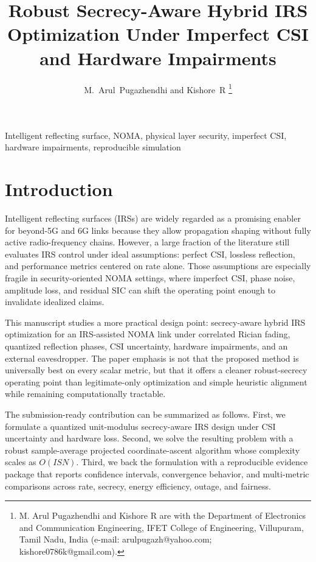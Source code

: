 \documentclass[journal]{IEEEtran}
\title{Robust Secrecy-Aware Hybrid IRS Optimization Under Imperfect CSI and Hardware Impairments}
\author{M.~Arul~Pugazhendhi and Kishore~R%
\thanks{M. Arul Pugazhendhi and Kishore R are with the Department of Electronics and Communication Engineering, IFET College of Engineering, Villupuram, Tamil Nadu, India (e-mail: arulpugazh@yahoo.com; kishore0786k@gmail.com).}}
\begin{document}
\maketitle

\begin{abstract}

\end{abstract}

\begin{IEEEkeywords}
Intelligent reflecting surface, NOMA, physical layer security, imperfect CSI, hardware impairments, reproducible simulation
\end{IEEEkeywords}

\section{Introduction}
Intelligent reflecting surfaces (IRSs) are widely regarded as a promising enabler for beyond-5G and 6G links because they allow propagation shaping without fully active radio-frequency chains. However, a large fraction of the literature still evaluates IRS control under ideal assumptions: perfect CSI, lossless reflection, and performance metrics centered on rate alone. Those assumptions are especially fragile in security-oriented NOMA settings, where imperfect CSI, phase noise, amplitude loss, and residual SIC can shift the operating point enough to invalidate idealized claims.

This manuscript studies a more practical design point: secrecy-aware hybrid IRS optimization for an IRS-assisted NOMA link under correlated Rician fading, quantized reflection phases, CSI uncertainty, hardware impairments, and an external eavesdropper. The paper emphasis is not that the proposed method is universally best on every scalar metric, but that it offers a cleaner robust-secrecy operating point than legitimate-only optimization and simple heuristic alignment while remaining computationally tractable.

The submission-ready contribution can be summarized as follows. First, we formulate a quantized unit-modulus secrecy-aware IRS design under CSI uncertainty and hardware loss. Second, we solve the resulting problem with a robust sample-average projected coordinate-ascent algorithm whose complexity scales as $O(ISN)$. Third, we back the formulation with a reproducible evidence package that reports confidence intervals, convergence behavior, and multi-metric comparisons across rate, secrecy, energy efficiency, outage, and fairness.
\end{document}

